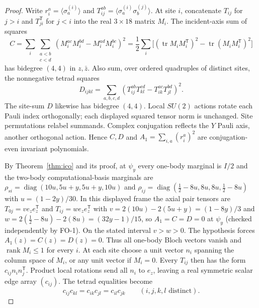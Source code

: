 \begin{proof}
Write $r_i^a=\langle\sigma_a^{(i)}\rangle$ and
$T_{ij}^{ab}=\langle\sigma_a^{(i)}\sigma_b^{(j)}\rangle$.
At site $i$, concatenate $T_{ij}$ for $j>i$ and $T_{ji}^{\mathsf T}$
for $j<i$ into the real $3\times18$ matrix $M_i$.  The incident-axis
sum of squares
\[
 C=\sum_i\sum_{\substack{a<b\\c<d}}
    (M_i^{ac}M_i^{bd}-M_i^{ad}M_i^{bc})^2
  =\frac12\sum_i\bigl[(\operatorname{tr}M_iM_i^{\mathsf T})^2
  -\operatorname{tr}(M_iM_i^{\mathsf T})^2\bigr]
\]
has bidegree $(4,4)$ in $z,\bar z$.  Also sum, over ordered quadruples
of distinct sites, the nonnegative tetrad squares
\[
 D_{ijkl}=\sum_{a,b,c,d}
 (T_{ij}^{ab}T_{kl}^{cd}-T_{ik}^{ac}T_{jl}^{bd})^2.
\]
The site-sum $D$ likewise has bidegree $(4,4)$.
Local $SU(2)$ actions rotate each Pauli index orthogonally; each
displayed squared tensor norm is unchanged.  Site permutations
relabel summands.  Complex conjugation reflects the $Y$ Pauli axis,
another orthogonal action.  Hence $C,D$ and
$A_1=\sum_{i,a}(r_i^a)^2$ are conjugation-even invariant polynomials.

By Theorem~\ref{thm:ico} and its proof, at $\psi_y$ every one-body marginal is $I/2$ and the two-body computational-basis marginals are $\rho_{si}=\operatorname{diag}(10u,5u+y,5u+y,10u)$ and $\rho_{ij}=\operatorname{diag}(\tfrac12-8u,8u,8u,\tfrac12-8u)$ with $u=(1-2y)/30$. In this displayed frame the axial pair tensors are $T_{0j}=ve_ze_z^{\mathsf T}$ and $T_{ij}=we_ze_z^{\mathsf T}$ with $v=2(10u)-2(5u+y)=(1-8y)/3$ and $w=2(\tfrac12-8u)-2(8u)=(32y-1)/15$, so $A_1=C=D=0$ at $\psi_y$ (checked independently by FO-1). On the stated interval $v>w>0$.
The hypothesis forces $A_1(z)=C(z)=D(z)=0$.
Thus all one-body Bloch vectors vanish and $\operatorname{rank}M_i\le1$
for every $i$.  At each site choose a unit vector $n_i$ spanning the
column space of $M_i$, or any unit vector if $M_i=0$.
Every $T_{ij}$ then has the form $c_{ij}n_i n_j^{\mathsf T}$.
Product local rotations send all $n_i$ to $e_z$, leaving a real
symmetric scalar edge array $(c_{ij})$.  The tetrad equalities become
\begin{equation}\label{eq:fivecopy-pair-tetrads}
 c_{ij}c_{kl}=c_{ik}c_{jl}=c_{il}c_{jk}
 \qquad(i,j,k,l\text{ distinct}).
\end{equation}


\end{proof}
